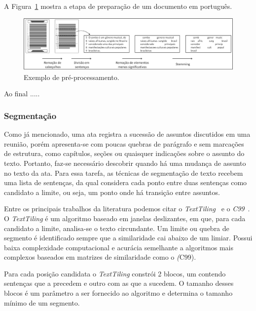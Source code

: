 A Figura~\ref{fig:exemplopreprocessamento} mostra a etapa de preparação de um documento em português.
	


  \begin{figure}
	\centering
	\includegraphics[width=1\textwidth]{conteudo/capitulos/figs/pre-processamento.jpg}
	\caption{Exemplo de pré-processamento.}
	\label{fig:exemplopreprocessamento}
  \end{figure}

Ao final .....


\subsubsection{Segmentação}


Como já mencionado, uma ata registra a sucessão de assuntos discutidos em uma reunião, porém apresenta-se com poucas quebras de parágrafo e sem marcações de estrutura, como capítulos, seções ou quaisquer indicações sobre o assunto do texto. Portanto, faz-se necessário descobrir quando há uma mudança de assunto no texto da ata. Para essa tarefa, as técnicas de segmentação de texto recebem uma lista de sentenças, da qual considera cada ponto entre duas sentenças como candidato a limite, ou seja, um ponto onde há transição entre assuntos. 


Entre os principais trabalhos da literatura podemos citar o  \textit{TextTiling}~\cite{Hearst1994} e o \textit{C99}~\cite{Choi2000}.
% 
O \textit{TextTiling} é um algoritmo baseado em janelas deslizantes, em  que, para cada candidato a limite, analisa-se o texto circundante. Um limite ou quebra de segmento é identificado sempre que a similaridade cai abaixo de um limiar. Possui baixa complexidade computacional e acurácia semelhante a algoritmos mais complexos baseados em matrizes de similaridade como o \textit(C99).

Para cada posição candidata o \textit{TextTiling} constrói 2 blocos, um contendo sentenças que a precedem e outro com as que a sucedem. O tamanho desses blocos é um parâmetro a ser fornecido ao algoritmo e determina o tamanho mínimo de um segmento.

